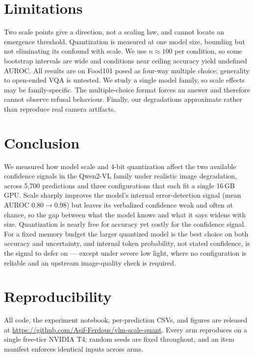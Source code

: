 \documentclass[11pt]{article}
\begin{document}
\section{Limitations}
Two scale points give a direction, not a scaling law, and cannot locate an
emergence threshold. Quantization is measured at one model size, bounding but not
eliminating its confound with scale. We use $n\approx100$ per condition, so some
bootstrap intervals are wide and conditions near ceiling accuracy yield undefined
AUROC. All results are on Food101 posed as four-way multiple choice; generality
to open-ended VQA is untested. We study a single model family, so scale effects
may be family-specific. The multiple-choice format forces an answer and therefore
cannot observe refusal behaviour. Finally, our degradations approximate rather
than reproduce real camera artifacts.

\section{Conclusion}
We measured how model scale and 4-bit quantization affect the two available
confidence signals in the Qwen2-VL family under realistic image degradation,
across 5{,}700 predictions and three configurations that each fit a single 16\,GB
GPU. Scale sharply improves the model's internal error-detection signal (mean
AUROC $0.80\!\to\!0.98$) but leaves its verbalized confidence weak and often at
chance, so the gap between what the model knows and what it says widens with size.
Quantization is nearly free for accuracy yet costly for the confidence signal.
For a fixed memory budget the larger quantized model is the best choice on both
accuracy and uncertainty, and internal token probability, not stated confidence,
is the signal to defer on --- except under severe low light, where no
configuration is reliable and an upstream image-quality check is required.

\section*{Reproducibility}
All code, the experiment notebook, per-prediction CSVs, and figures are released
at \url{https://github.com/Asif-Ferdous/vlm-scale-quant}. Every arm reproduces on
a single free-tier NVIDIA T4; random seeds are fixed throughout, and an item
manifest enforces identical inputs across arms.
\end{document}
